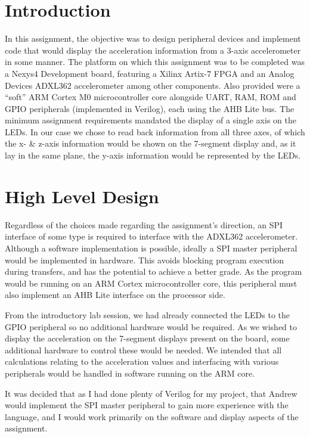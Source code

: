 \documentclass[11pt,british]{report}
\begin{document}
\section*{Introduction}
In this assignment, the objective was to design peripheral devices and implement code that would display the acceleration information from a 3-axis accelerometer in some manner. The platform on which this assignment was to be completed was a Nexys4 Development board, featuring a Xilinx Artix-7 FPGA and an Analog Devices ADXL362 accelerometer among other components. Also provided were a ``soft'' ARM Cortex M0 microcontroller core alongside UART, RAM, ROM and GPIO peripherals (implemented in Verilog), each using the AHB Lite bus. The minimum assignment requirements mandated the display of a single axis on the LEDs. In our case we chose to read back information from all three axes, of which the x- \& z-axis information would be shown on the 7-segment display and, as it lay in the same plane, the y-axis information would be represented by the LEDs. 

\section*{High Level Design}
Regardless of the choices made regarding the assignment's direction, an SPI interface of some type is required to interface with the ADXL362 accelerometer. Although a software implementation is possible, ideally a SPI master peripheral would be implemented in hardware. This avoids blocking program execution during transfers, and has the potential to achieve a better grade. As the program would be running on an ARM Cortex microcontroller core, this peripheral must also implement an AHB Lite interface on the processor side.

From the introductory lab session, we had already connected the LEDs to the GPIO peripheral so no additional hardware would be required. As we wished to display the acceleration on the 7-segment displays present on the board, some additional hardware to control these would be needed. We intended that all calculations relating to the acceleration values and interfacing with various peripherals would be handled in software running on the ARM core.

It was decided that as I had done plenty of Verilog for my project, that Andrew would implement the SPI master peripheral to gain more experience with the language, and I would work primarily on the software and display aspects of the assignment.
\end{document}
